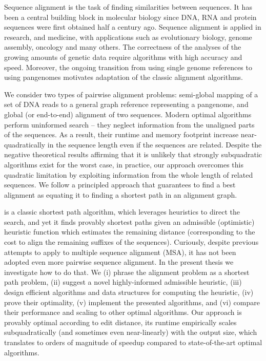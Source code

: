 Sequence alignment is the task of finding similarities between sequences. It has
been a central building block in molecular biology since DNA, RNA and protein
sequences were first obtained half a century ago. Sequence alignment is applied
in research, and medicine, with applications such as evolutionary biology,
genome assembly, oncology and many others. The correctness of the analyses of
the growing amounts of genetic data require algorithms with high accuracy and
speed. Moreover, the ongoing transition from using single genome references to
using pangenomes motivates adaptation of the classic alignment algorithms.

We consider two types of pairwise alignment problems: semi-global mapping of a
set of DNA reads to a general graph reference representing a pangenome, and
global (or end-to-end) alignment of two sequences. Modern optimal algorithms
perform uninformed search -- they neglect information from the unaligned parts of
the sequences. As a result, their runtime and memory footprint increase
near-quadratically in the sequence length even if the sequences are related.
Despite the negative theoretical results affirming that it is unlikely that
strongly subquadratic algorithms exist for the worst case, in practice, our
approach overcomes this quadratic limitation by exploiting information from the
whole length of related sequences. We follow a principled approach that
guarantees to find a best alignment as equating it to finding a shortest path in
an alignment graph.

\A is a classic shortest path algorithm, which leverages heuristics to direct
the search, and yet it finds provably shortest paths given an admissible
(optimistic) heuristic function which estimates the remaining distance
(corresponding to the cost to align the remaining suffixes of the sequences).
Curiously, despite previous attempts to apply \A to multiple sequence alignment
(MSA), it has not been adopted even more pairwise sequence alignment. In the
present thesis we investigate how to do that. We (i) phrase the alignment
problem as a shortest path problem, (ii) suggest a novel highly-informed
admissible heuristic, (iii) design efficient algorithms and data structures for
computing the heuristic, (iv) prove their optimality, (v) implement the
presented algorithms, and (vi) compare their performance and scaling to other
optimal algorithms. Our approach is provably optimal according to edit distance,
its runtime empirically scales subquadratically (and sometimes even
near-linearly) with the output size, which translates to orders of magnitude of
speedup compared to state-of-the-art optimal algorithms.

